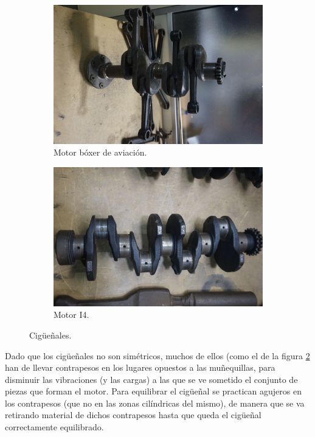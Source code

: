 \begin{figure}[H]
	\centering
	\begin{subfigure}[b]{0.45\textwidth}
		\centering
		\includegraphics[width=\linewidth]{Figures/02/m4/cig_boxer.jpg}
		\caption{Motor bóxer de aviación.}
		\label{fig:box_cig}
	\end{subfigure}
	\hfill
	\begin{subfigure}[b]{0.45\textwidth}
 		\centering
 		\includegraphics[width=\linewidth]{Figures/02/m4/cig_I4.jpg}
 		\caption{Motor I4.}
		\label{fig:cig_I4}
	\end{subfigure}    
	\caption{Cigüeñales.}
	\label{fig:cigs}
\end{figure}

Dado que los cigüeñales no son simétricos, muchos de ellos (como el de la figura \ref{fig:cig_I4} han de llevar contrapesos en los lugares opuestos a las muñequillas, para disminuir las vibraciones (y las cargas) a las que se ve sometido el conjunto de piezas que forman el motor. Para equilibrar el cigüeñal se practican agujeros en los contrapesos (que no en las zonas cilíndricas del mismo), de manera que se va retirando material de dichos contrapesos hasta que queda el cigüeñal correctamente equilibrado.\\


